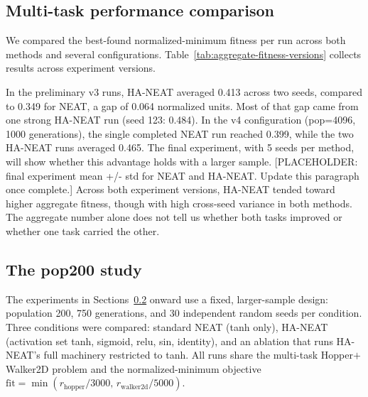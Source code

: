 \documentclass[12pt]{article}
\begin{document}
\subsection{Multi-task performance comparison}

We compared the best-found normalized-minimum fitness per run across both methods and several configurations. Table~\ref{tab:aggregate-fitness-versions} collects results across experiment versions.

\begin{table}[h]
\centering
\caption{Aggregate normalized-minimum fitness per method across experiment versions.}
\label{tab:aggregate-fitness-versions}
\end{table}



In the preliminary v3 runs, HA-NEAT averaged 0.413 across two seeds, compared to 0.349 for NEAT, a gap of 0.064 normalized units. Most of that gap came from one strong HA-NEAT run (seed 123: 0.484). In the v4 configuration (pop=4096, 1000 generations), the single completed NEAT run reached 0.399, while the two HA-NEAT runs averaged 0.465. The final experiment, with 5 seeds per method, will show whether this advantage holds with a larger sample. [PLACEHOLDER: final experiment mean +/- std for NEAT and HA-NEAT. Update this paragraph once complete.]
Across both experiment versions, HA-NEAT tended toward higher aggregate fitness, though with high cross-seed variance in both methods. The aggregate number alone does not tell us whether both tasks improved or whether one task carried the other.

\subsection{The pop200 study}
\label{sec:pop200}
The experiments in Sections~\ref{sec:pop200} onward use a fixed, larger-sample design:
population 200, 750 generations, and 30 independent random seeds per condition. Three conditions
were compared: standard NEAT (tanh only), HA-NEAT (activation set tanh, sigmoid, relu, sin,
identity), and an ablation that runs HA-NEAT's full machinery restricted to tanh. All runs share
the multi-task Hopper$+$Walker2D problem and the normalized-minimum objective
$\mathrm{fit} = \min(r_{\text{hopper}}/3000,\, r_{\text{walker2d}}/5000)$.
\end{document}
